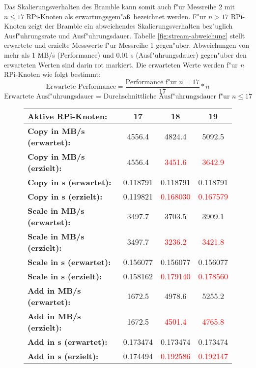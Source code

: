 Das Skalierungsverhalten des Bramble kann somit auch f"ur Messreihe 2 mit $n\leq 17$ RPi-Knoten als erwartungsgem"a\ss\ bezeichnet werden.  
\noindent
F"ur $n > 17$ RPi-Knoten zeigt der Bramble ein abweichendes Skalierungsverhalten bez"uglich Ausf"uhrungsrate und Ausf"uhrungsdauer. Tabelle \ref{fig:stream-abweichung} stellt erwartete und erzielte Messwerte f"ur Messreihe 1 gegen"uber. Abweichungen von mehr als 1 MB/s (Performance) und 0.01 s (Ausf"uhrungsdauer) gegen"uber den erwarteten Werten sind darin rot markiert. Die erwarteten Werte werden f"ur \textit{n} RPi-Knoten wie folgt bestimmt: 
\[\text{Erwartete Performance} = \frac{\text{Performance f"ur }n=17}{17}\ast n\] 
\[\text{Erwartete Ausf"uhrungsdauer = Durchschnittliche Ausf"uhrungsdauer f"ur }n\leq 17\]
\begin{figure}
  \centering
  \begin{tabular}{|l|c|c|c|}
    \hline 
    \textbf{Aktive RPi-Knoten:} & \textbf{17} & \textbf{18} & \textbf{19}\\ 
    \hline 
    \textbf{Copy in MB/s (erwartet):} & 4556.4 & 4824.4 & 5092.5\\
    \hline 
    \textbf{Copy in MB/s (erzielt):} & 4556.4 & \textcolor{red}{3451.6} & \textcolor{red}{3642.9}\\
    \hline 
    \textbf{Copy in s (erwartet):} & 0.118791 & 0.118791 & 0.118791\\
    \hline 
    \textbf{Copy in s (erzielt):} & 0.119821 & \textcolor{red}{0.168030} & \textcolor{red}{0.167579}\\
    \hline 
    \textbf{Scale in MB/s (erwartet):} & 3497.7 & 3703.5 & 3909.1\\
    \hline 
    \textbf{Scale in MB/s (erzielt):} & 3497.7 & \textcolor{red}{3236.2} & \textcolor{red}{3421.8}\\
    \hline 
	\textbf{Scale in s (erwartet):} & 0.156077 & 0.156077 & 0.156077\\
    \hline 
    \textbf{Scale in s (erzielt):} & 0.158162 & \textcolor{red}{0.179140} & \textcolor{red}{0.178560}\\
    \hline 
    \textbf{Add in MB/s (erwartet):} & 1672.5 & 4978.6 & 5255.2\\
    \hline 
    \textbf{Add in MB/s (erzielt):} & 1672.5 & \textcolor{red}{4501.4} & \textcolor{red}{4765.8}\\
    \hline 
    \textbf{Add in s (erwartet):} & 0.173474 & 0.173474 & 0.173474\\
    \hline 
    \textbf{Add in s (erzielt):} & 0.174494 & \textcolor{red}{0.192586} & \textcolor{red}{0.192147}\\

\end{tabular}
\end{figure}
